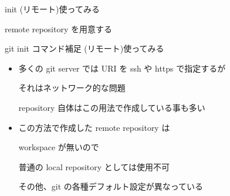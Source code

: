 % 
% 
% 
% 

\begin{frame}[t]{init (リモート)}{使ってみる}

  remote repository を用意する
  \vspace{4ex}


\end{frame}


\begin{frame}[t]{git init コマンド補足 (リモート)}{使ってみる}

  \begin{itemize}
  \item 多くの git server では URI を ssh や https で指定するが

    それはネットワーク的な問題

    repository 自体はこの用法で作成している事も多い
    \vspace{2ex}

  \item この方法で作成した remote repository は

    workspace が無いので

    普通の local repository としては使用不可

    その他、git の各種デフォルト設定が異なっている
  \end{itemize}

\end{frame}

